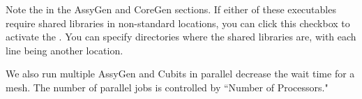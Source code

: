 Note the  in the AssyGen and CoreGen sections.  If either of these executables require shared libraries in non-standard locations, you can click this checkbox to activate the .  You can specify directories where the shared libraries are, with each line being another location.

We also run multiple AssyGen and Cubits in parallel decrease the wait time for a mesh.  The number of parallel jobs is controlled by ``Number of Processors."